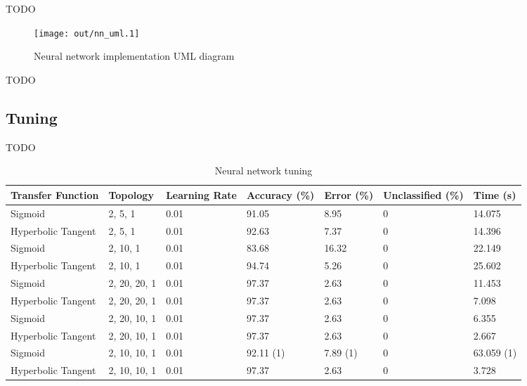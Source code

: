 \documentclass[a4paper]{article}
\begin{document}
TODO

\begin{figure}[h!]
  \centering
  \texttt{[image: out/nn\_uml.1]}
  \caption{Neural network implementation UML diagram}
  \label{fig:nn_uml}
\end{figure}

TODO

\subsection{Tuning}
\label{sec:nn_tuning}

TODO

\begin{table}[h!]
  \centering
  \begin{tabular}{@{}lllllll@{}}
    \toprule
    Transfer Function  & Topology     & Learning Rate & Accuracy (\%) & Error (\%) & Unclassified (\%) & Time (s)   \\
    \midrule
    Sigmoid            & 2, 5, 1      & 0.01          & 91.05         & 8.95       & 0                 & 14.075     \\
    Hyperbolic Tangent & 2, 5, 1      & 0.01          & 92.63         & 7.37       & 0                 & 14.396     \\
    Sigmoid            & 2, 10, 1     & 0.01          & 83.68         & 16.32      & 0                 & 22.149     \\
    Hyperbolic Tangent & 2, 10, 1     & 0.01          & 94.74         & 5.26       & 0                 & 25.602     \\
    Sigmoid            & 2, 20, 20, 1 & 0.01          & 97.37         & 2.63       & 0                 & 11.453     \\
    Hyperbolic Tangent & 2, 20, 20, 1 & 0.01          & 97.37         & 2.63       & 0                 & 7.098      \\
    Sigmoid            & 2, 20, 10, 1 & 0.01          & 97.37         & 2.63       & 0                 & 6.355      \\
    Hyperbolic Tangent & 2, 20, 10, 1 & 0.01          & 97.37         & 2.63       & 0                 & 2.667      \\
    Sigmoid            & 2, 10, 10, 1 & 0.01          & 92.11 (1)     & 7.89 (1)   & 0                 & 63.059 (1) \\
    Hyperbolic Tangent & 2, 10, 10, 1 & 0.01          & 97.37         & 2.63       & 0                 & 3.728      \\
    \bottomrule
  \end{tabular}
  \caption{Neural network tuning}
  \label{tab:nn_tuning}
\end{table}
\end{document}
